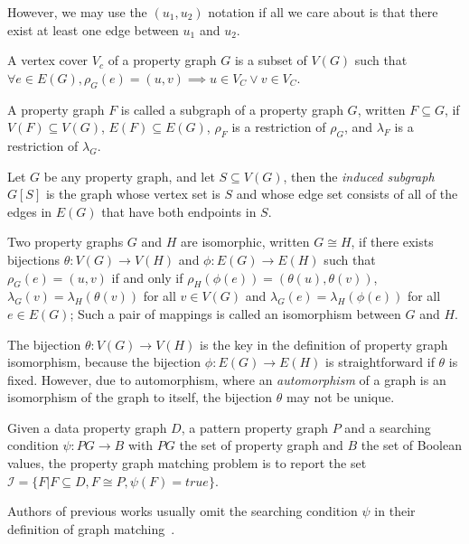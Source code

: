 However, we may use the $(u_1, u_2)$ notation if all we care about is that there exist at least one edge between $u_1$ and $u_2$.
\begin{definition}
  A vertex cover $V_c$ of a property graph $G$ is a subset of $V(G)$ such that
  $\forall e \in E(G), \rho_G(e) = (u, v) \implies u \in V_C \lor v \in V_C$.
\end{definition}
\begin{definition}[Subgraph]
  A property graph $F$ is called a subgraph of a property graph $G$, written $F \subseteq G$, if
  $V(F) \subseteq V(G)$, $E(F) \subseteq E(G)$, $\rho_F$ is a restriction of $\rho_G$, and $\lambda_F$ is a restriction of $\lambda_G$.
\end{definition}
Let $G$ be any property graph, and let $S \subseteq V(G)$, then the \emph{induced subgraph} $G[S]$ is the graph whose vertex set is $S$ and whose edge set consists of all of the edges in $E(G)$ that have both endpoints in $S$.
\begin{definition}
  Two property graphs $G$ and $H$ are isomorphic, written $G \cong H$,
  if there exists bijections $\theta: V(G) \rightarrow V(H)$ and $\phi: E(G) \rightarrow E(H)$ such that
  $\rho_G(e) = (u, v)$ if and only if $\rho_H(\phi(e)) = (\theta(u), \theta(v))$,
  $\lambda_G(v) = \lambda_H(\theta(v))$ for all $v \in V(G)$
  and $\lambda_G(e) = \lambda_H(\phi(e))$ for all $e \in E(G)$;
  Such a pair of mappings is called an isomorphism between $G$ and $H$.
\end{definition}
The bijection $\theta: V(G) \rightarrow V(H)$ is the key in the definition of property graph isomorphism,
because the bijection $\phi: E(G) \rightarrow E(H)$ is straightforward if $\theta$ is fixed.
However, due to automorphism, where an \emph{automorphism} of a graph is an isomorphism of the graph to itself,
the bijection $\theta$ may not be unique.
\begin{definition}\label{def:property_graph_matching}
  Given a data property graph $D$, a pattern property graph $P$ and a searching condition $\psi: PG \rightarrow B$ with $PG$ the set of property graph and $B$ the set of Boolean values,
  the property graph matching problem is to report the set $\mathcal{I} = \{F | F \subseteq D, F \cong P, \psi(F) = true\}$.
\end{definition}
Authors of previous works usually omit the searching condition $\psi$ in their definition of graph matching~\cite{DBLP:conf/sigmod/ShaoCCMYX14,DBLP:journals/pvldb/LaiQLC15,DBLP:conf/sigmod/KimLBHLKJ16,DBLP:journals/pvldb/QiaoZC17}.
